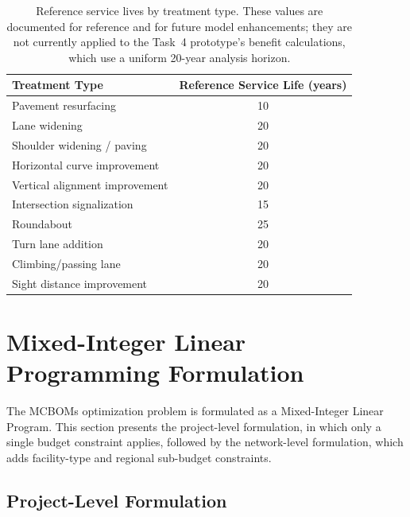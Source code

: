 \begin{table}[H]
\centering
\caption{Reference service lives by treatment type. These values are
documented for reference and for future model enhancements; they are not
currently applied to the Task~4 prototype's benefit calculations, which use a
uniform 20-year analysis horizon.}
\label{tab:service-life}
\begin{tabular}{lc}
\toprule
\textbf{Treatment Type} & \textbf{Reference Service Life (years)} \\
\midrule
Pavement resurfacing                  & 10 \\
Lane widening                         & 20 \\
Shoulder widening / paving            & 20 \\
Horizontal curve improvement          & 20 \\
Vertical alignment improvement        & 20 \\
Intersection signalization            & 15 \\
Roundabout                            & 25 \\
Turn lane addition                    & 20 \\
Climbing/passing lane                 & 20 \\
Sight distance improvement            & 20 \\
\bottomrule
\end{tabular}
\end{table}

\section{Mixed-Integer Linear Programming Formulation}
\label{sec:milp}

The MCBOMs optimization problem is formulated as a Mixed-Integer Linear
Program. This section presents the project-level formulation, in which only a
single budget constraint applies, followed by the network-level formulation,
which adds facility-type and regional sub-budget constraints.

\subsection{Project-Level Formulation}
\label{sec:milp-project}


